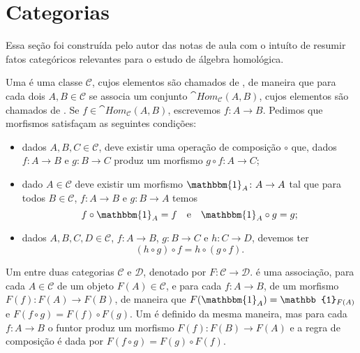 \section{Categorias}

Essa seção foi construída pelo autor das notas de aula com o intuíto de resumir fatos categóricos relevantes para o estudo de álgebra homológica.

Uma  é uma classe $\mathcal{C}$, cujos elementos são chamados de , de maneira que para cada dois $A, B \in \mathcal{C}$ se associa um conjunto $\cat{Hom}_{\mathcal{C}}(A,B)$, cujos elementos são chamados de . Se $f \in \cat{Hom}_\mathcal{C}(A,B)$, escrevemos $f \colon A \to B$. Pedimos que morfismos satisfaçam as seguintes condições: \begin{itemize}
    \item dados $A, B, C \in \mathcal{C}$, deve existir uma operação de composição $\circ$ que, dados $f \colon A \to B$ e $g \colon B \to C$ produz um morfismo $g \circ f \colon A \to C$;
    \item dado $A \in \mathcal{C}$ deve existir um morfismo $\mathbbm{1}_A \colon A \to A$ tal que para todos $B \in \mathcal{C}$, $f \colon A \to B$ e $g \colon B \to A$ temos \begin{equation}
        f \circ \mathbbm{1}_A = f \quad \text{e} \quad \mathbbm{1}_A \circ g = g;
    \end{equation}
    \item dados $A, B, C, D \in \mathcal{C}$, $f \colon A \to B$, $g \colon B \to C$ e $h \colon C \to D$, devemos ter \begin{equation}
        (h \circ g) \circ f = h \circ (g \circ f).
    \end{equation}
\end{itemize}

Um  entre duas categorias $\mathcal{C}$ e $\mathcal{D}$, denotado por $F \colon \mathcal{C} \to \mathcal{D}$. é uma associação, para cada $A \in \mathcal{C}$ de um objeto $F(A) \in \mathcal{C}$, e para cada $f \colon A \to B$, de um morfismo $F(f) \colon F(A) \to F(B)$, de maneira que $F(\mathbbm{1}_A) = \mathbb{1}_{F(A)}$ e $F(f \circ g) = F(f) \circ F(g)$. Um  é definido da mesma maneira, mas para cada $f \colon A \to B$ o funtor produz um morfismo $F(f) \colon F(B) \to F(A)$ e a regra de composição é dada por $F(f \circ g) = F(g) \circ F(f)$.


